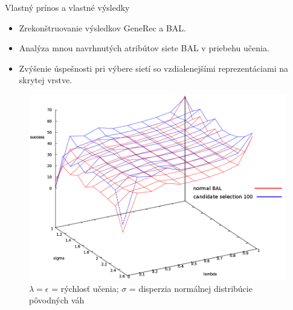 \documentclass[xcolor=dvipsnames]{beamer}
\begin{document}
\begin{frame}{Vlastný prínos a vlastné výsledky}
  \begin{itemize}
    \item Zrekonštruovanie výsledkov GeneRec a BAL. 
    \item Analýza mnou navrhnutých atribútov siete BAL v priebehu učenia. 
    \item Zvýšenie úspešnosti pri výbere sietí so vzdialenejšími reprezentáciami na skrytej vrstve. 
  \end{itemize} 
  
  \begin{figure}[h!]  
    \centering
    \vspace{-8pt} 
    \includegraphics[scale=0.20]{img/compare_normal_and_hdist2.png}
    \caption{{\tiny $\lambda = \epsilon$ = rýchlosť učenia; $\sigma$ = disperzia normálnej distribúcie pôvodných váh}} 
  \end{figure} 
\end{frame}


\end{document}
